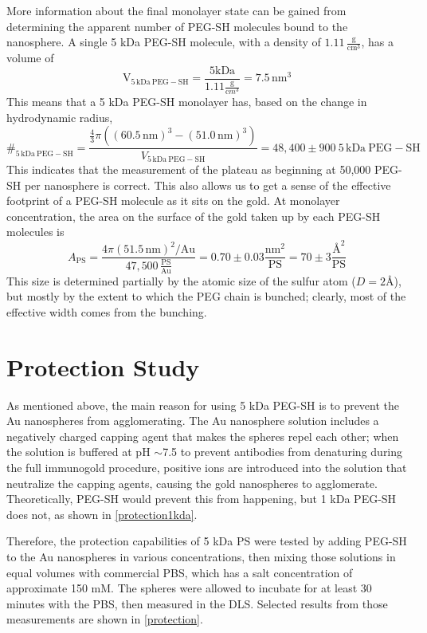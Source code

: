 More information about the final monolayer state can be gained from determining the apparent number of PEG-SH molecules bound to the nanosphere. A single 5 kDa PEG-SH molecule, with a density of $1.11\,\mathrm{\frac{g}{cm^3}}$, has a volume of
\[\mathrm{V_{5\,kDa\ PEG-SH}}
=\frac{5\mathrm{kDa}}{1.11\frac{\mathrm g}{\mathrm cm^3}}=7.5\mathrm{\,nm^3}\]
This means that a 5 kDa PEG-SH monolayer has, based on the change in hydrodynamic radius,
\[\#_{\mathrm{5\,kDa\ PEG-SH}}=
\frac{\frac{4}{3}\pi((60.5\mathrm{\,nm})^3-(51.0\mathrm{\,nm})^3)} {V_{\mathrm{5\,kDa\ PEG-SH}}}=48,400\pm900\mathrm{\ 5\,kDa\ PEG-SH}\]
This indicates that the measurement of the plateau as beginning at 50,000 PEG-SH per nanosphere is correct. This also allows us to get a sense of the effective footprint of a PEG-SH molecule as it sits on the gold. At monolayer concentration, the area on the surface of the gold taken up by each PEG-SH molecules is
\[A_{\mathrm{PS}}=\frac{4\pi(51.5\mathrm{\,nm})^2/\mathrm{Au}} {47,500\,\mathrm{\frac{PS}{Au}}}=0.70\pm0.03\frac{\mathrm{nm}^2}{\mathrm{PS}}=70\pm3\frac{\text{\AA}^2}{\mathrm{PS}}\]
This size is determined partially by the atomic size of the sulfur atom ($D=2\text{\AA}$), but mostly by the extent to which the PEG chain is bunched; clearly, most of the effective width comes from the bunching.

\section{Protection Study}
\label{protectionstudy}

As mentioned above, the main reason for using 5 kDa PEG-SH is to prevent the Au nanospheres from agglomerating. The Au nanosphere solution includes a negatively charged capping agent that makes the spheres repel each other; when the solution is buffered at pH \ensuremath{\sim}7.5 to prevent antibodies from denaturing during the full immunogold procedure, positive ions are introduced into the solution that neutralize the capping agents, causing the gold nanospheres to agglomerate. Theoretically, PEG-SH would prevent this from happening, but 1 kDa PEG-SH does not, as shown in \autoref{protection1kda}.

Therefore, the protection capabilities of 5 kDa PS were tested by adding PEG-SH to the Au nanospheres in various concentrations, then mixing those solutions in equal volumes with commercial PBS, which has a salt concentration of approximate 150 mM. The spheres were allowed to incubate for at least 30 minutes with the PBS, then measured in the DLS. Selected results from those measurements are shown in \autoref{protection}.

